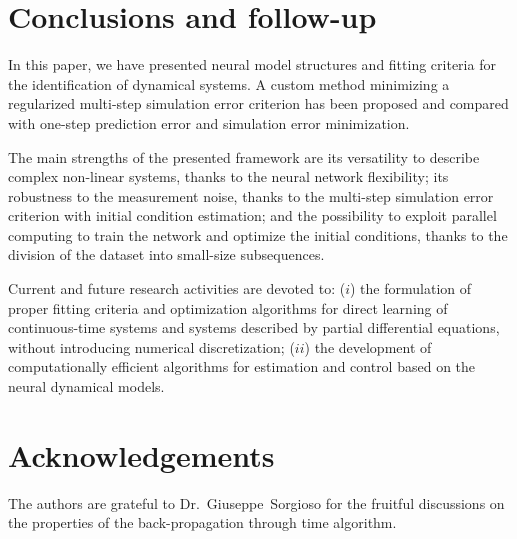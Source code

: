 \documentclass{article}
\begin{document}

\section{Conclusions and follow-up}
\label{sec:conclusions}
In this paper, we have presented neural model structures and fitting criteria for the identification    of dynamical systems.  A custom method minimizing a regularized multi-step simulation error criterion has been  proposed and compared with one-step prediction error and simulation error minimization.  

The main strengths of the presented framework are its versatility to describe complex non-linear systems, thanks to the neural network flexibility; its robustness to the measurement noise, thanks to the multi-step simulation error criterion
with initial condition estimation; and the possibility to exploit parallel computing to train the network and optimize the initial conditions, thanks to the division of the dataset into small-size subsequences. 

Current and future research activities are devoted to: ($i$) the formulation of proper fitting criteria and optimization algorithms for direct learning of continuous-time systems and systems described by partial differential equations, without introducing numerical discretization; ($ii$) the development of computationally efficient algorithms for estimation and control based on the  neural dynamical models. 

\section*{Acknowledgements}
 The authors are grateful to Dr.~Giuseppe~Sorgioso for the fruitful discussions on the properties of the back-propagation through time algorithm.

                                                   
\end{document}
